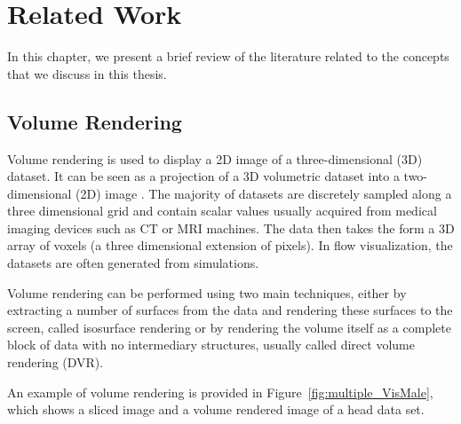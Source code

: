 \chapter{Related Work \label{related_work_chapter}}
In this chapter, we present a brief review of the literature related to the concepts that we discuss in this thesis.

\section{Volume Rendering \label{volume_rendering}}
Volume rendering is used to display a 2D image of a three-dimensional (3D) dataset. It can be seen as a projection of a 3D volumetric dataset into a two-dimensional (2D) image
\cite{garcia_parallel_2006}.
The majority of datasets are discretely sampled along a three
dimensional grid and contain scalar values usually acquired from medical
imaging devices such as CT or MRI machines. The data then takes the form
a 3D array of voxels (a three dimensional extension of pixels).
In flow visualization, the datasets are often generated from simulations.

Volume rendering can be performed using two main techniques, either by extracting a
number of surfaces from the data and rendering these surfaces to the screen,
called isosurface rendering or by rendering the volume itself as a complete
block of data with no intermediary structures, usually called direct volume
rendering (DVR).


An example of volume rendering is provided in Figure~\ref{fig:multiple_VisMale}, which shows a sliced image and a volume rendered image of a head data set.



